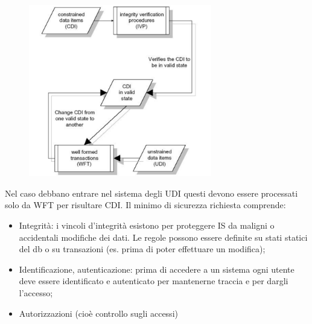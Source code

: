 \begin{figure}[H]
      \centering
      \includegraphics[width=8cm, keepaspectratio]{capitoli/policy/imgs/clark_wilson4.png}
\end{figure}

Nel caso debbano entrare nel sistema degli UDI questi devono essere processati
solo da WFT per
risultare CDI.
Il minimo di sicurezza richiesta comprende:
\begin{itemize}
      \item Integrità: i vincoli d’integrità esistono per proteggere IS da
            maligni o accidentali modifiche
            dei dati. Le regole possono essere definite su stati statici del db
            o su transazioni (es. prima
            di poter effettuare un modifica);
      \item Identificazione, autenticazione: prima di accedere a un sistema ogni
            utente deve essere
            identificato e autenticato per mantenerne traccia e per dargli
            l’accesso;
      \item Autorizzazioni (cioè controllo sugli accessi)
\end{itemize}

